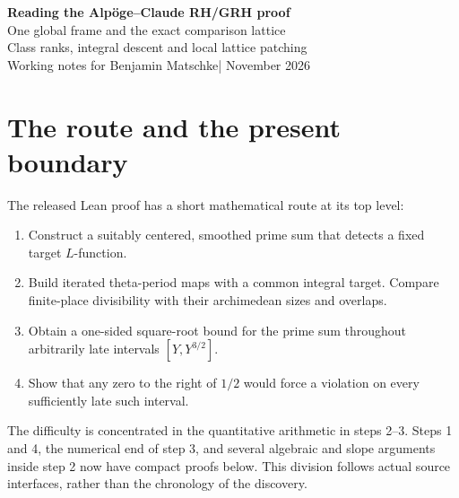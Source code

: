 \documentclass[11pt,a4paper]{article}
\numberwithin{equation}{section}
\theoremstyle{remark}\newtheorem{remark}[theorem]{Remark}
\begin{document}
\begin{center}
{\LARGE\bfseries Reading the Alp\"oge--Claude RH/GRH proof}\\[7pt]
{\large One global frame and the exact comparison lattice}\\[-1pt]
{\large Class ranks, integral descent and local lattice patching}\\[8pt]
Working notes for Benjamin Matschke\quad | November 2026
\end{center}

\begingroup\setlength{\fboxsep}{9pt}
\noindent{}\endgroup

\section{The route and the present boundary}

The released Lean proof has a short mathematical route at its top level:
\begin{enumerate}
\item Construct a suitably centered, smoothed prime sum that detects a fixed target $L$-function.
\item Build iterated theta-period maps with a common integral target. Compare finite-place divisibility with their archimedean sizes and overlaps.
\item Obtain a one-sided square-root bound for the prime sum throughout arbitrarily late intervals $[Y,Y^{3/2}]$.
\item Show that any zero to the right of $1/2$ would force a violation on every sufficiently late such interval.
\end{enumerate}
The difficulty is concentrated in the quantitative arithmetic in steps 2--3. Steps 1 and 4, the numerical end of step 3, and several algebraic and slope arguments inside step 2 now have compact proofs below. This division follows actual source interfaces, rather than the chronology of the discovery.
\end{document}
